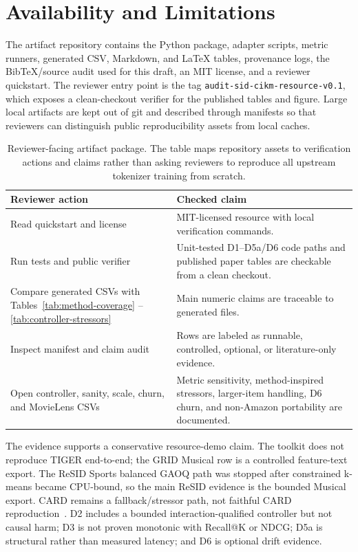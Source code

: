 \section{Availability and Limitations}

The artifact repository contains the \tool Python package, adapter scripts,
metric runners, generated CSV, Markdown, and \LaTeX{} tables, provenance logs,
the BibTeX/source audit used for this draft, an MIT license, and a reviewer
quickstart. The reviewer entry point is the tag
\texttt{audit-sid-cikm-resource-v0.1}, which exposes a clean-checkout verifier
for the published tables and figure. Large local artifacts are kept out of git
and described through manifests so that reviewers can distinguish public
reproducibility assets from local caches.

\begin{table}[t]
\caption{Reviewer-facing artifact package. The table maps repository assets to
verification actions and claims rather than asking reviewers to reproduce all
upstream tokenizer training from scratch.}
\label{tab:artifact-package}
\small
\setlength{\tabcolsep}{3pt}
\begin{tabularx}{\columnwidth}{@{}p{}Y@{}}
\toprule
Reviewer action & Checked claim \\
\midrule
Read quickstart and license & MIT-licensed resource with local verification
commands. \\
Run tests and public verifier & Unit-tested D1--D5a/D6 code paths and published
paper tables are checkable from a clean checkout. \\
Compare generated CSVs with Tables~\ref{tab:method-coverage}
--\ref{tab:controller-stressors} & Main numeric claims are traceable to
generated files. \\
Inspect manifest and claim audit & Rows are labeled as runnable, controlled,
optional, or literature-only evidence. \\
Open controller, sanity, scale, churn, and MovieLens CSVs & Metric sensitivity,
method-inspired stressors, larger-item handling, D6 churn, and non-Amazon
portability are documented. \\
\bottomrule
\end{tabularx}
\end{table}

The evidence supports a conservative resource-demo claim. The toolkit does not
reproduce TIGER end-to-end; the GRID Musical row is a controlled feature-text
export. The ReSID Sports balanced GAOQ path was stopped after constrained
k-means became CPU-bound, so the main ReSID evidence is the bounded Musical
export. CARD remains a fallback/stressor path, not faithful CARD
reproduction~\cite{wei2026card}. D2 includes a bounded interaction-qualified
controller but not causal harm; D3 is not proven monotonic with Recall@K or
NDCG; D5a is structural rather than measured latency; and D6 is optional drift
evidence.

